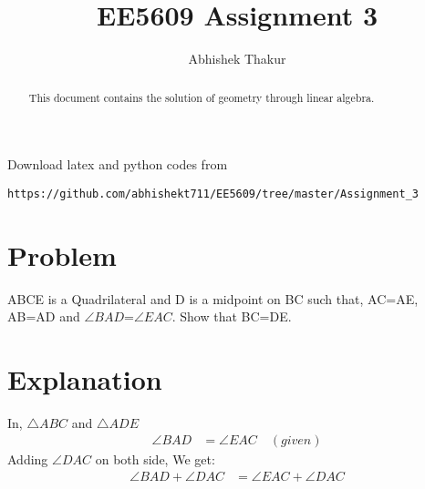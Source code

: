 \documentclass[journal,12pt,twocolumn]{IEEEtran}
\begin{document}
     \def\rightbox#1{\makebox[0in][r]{#1}}
     \def\centbox#1{\makebox[0in]{#1}}
     \def\topbox#1{\raisebox{-\baselineskip}[0in][0in]{#1}}
     \def\midbox#1{\raisebox{-0.5\baselineskip}[0in][0in]{#1}}
\vspace{3cm}
\title{EE5609 Assignment 3}
\author{Abhishek Thakur}
\maketitle
\newpage
\bigskip
\renewcommand{\thefigure}{\theenumi}
\renewcommand{\thetable}{\theenumi}
\begin{abstract}
This document contains the solution of geometry through linear algebra.
\end{abstract}
Download latex and python codes from 
\begin{lstlisting}
https://github.com/abhishekt711/EE5609/tree/master/Assignment_3
\end{lstlisting}
%
\section{Problem}
ABCE is a Quadrilateral and D is a midpoint on BC such that, AC=AE, AB=AD and $\angle BAD$=$\angle EAC$. Show that BC=DE.
\section{Explanation}
In, $\triangle{ABC}$ and $\triangle{ADE}$
\begin{align} 
\angle BAD &= \angle EAC \quad (given) \label{eq1}
\end{align}
Adding $\angle DAC$ on both side, We get:
\begin{align}
 \angle BAD + \angle DAC &= \angle EAC + \angle DAC \label{eqn_2} 
\end{align}
\end{document}
